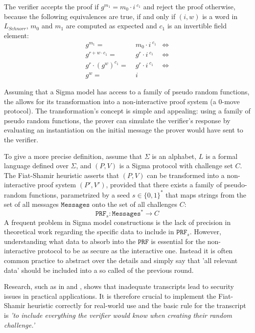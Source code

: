 \begin{example}
The verifier accepts the proof if $g^{m_1} = m_0\cdot i^{\;c_1}$ and reject the proof otherwise, because the following equivalences are true, if and only if $(i,w)$ is a word in $L_{Schnorr}$, $m_0$ and $m_1$ are computed as expected and $c_1$ is an invertible field element:
\begin{align*}
g^{m_1} =\; & m_0\cdot i^{\;c_1} & \Leftrightarrow\\
g^{r+w\cdot c_1} =\; & g^{r} \cdot i^{\;c_1} &\Leftrightarrow \\
g^r \cdot (g^w)^{c_1} =\; & g^{r} \cdot i^{\;c_1} & \Leftrightarrow \\
g^w =\; & i
\end{align*}
\end{example}
Assuming that a Sigma model has access to a family of pseudo random functions, the  allows for its transformation into a non-interactive proof system (a $0$-move protocol). The transformation's concept is simple and appealing: using a family of pseudo random functions, the prover can simulate the verifier's response by evaluating an instantiation on the initial message the prover would have sent to the verifier.

To give a more precise definition, assume that $\Sigma$ is an alphabet, $L$ is a formal language defined over $\Sigma$, and $(P,V)$ is a Sigma protocol with challenge set $C$. The Fiat-Shamir heuristic asserts that $(P,V)$ can be transformed into a non-interactive proof system $(P',V')$, provided that there exists a family of pseudo-random functions, parametrized by a seed $s\in\{0,1\}^*$ that maps strings from the set of all messages $\mathtt{Messages}$ onto the set of all challenges $C$:
\begin{equation}
\mathtt{PRF}_s: \mathtt{Messages}^* \to C    
\end{equation}
A frequent problem in Sigma model constructions is the lack of precision in theoretical work regarding the specific data to include in $\mathtt{PRF}_s$. However, understanding what data to absorb into the $\mathtt{PRF}$ is essential for the non-interactive protocol to be as secure as the interactive one. Instead it is often common practice to abstract over the details and simply say that 'all relevant data' should be included into a so called   of the previous round.

Research, such as in \cite{dao-23} and \cite{bernhard-16}, shows that inadequate transcripts lead to security issues in practical applications. It is therefore crucial to implement the Fiat-Shamir heuristic correctly for real-world use and the basic rule for the transcript is \textit{'to include everything the verifier would know when creating their random challenge.'}

